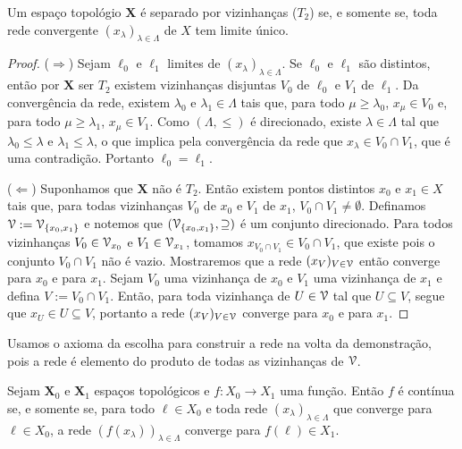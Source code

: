 \begin{prop}
Um espaço topológio $\bm X$ é separado por vizinhanças ($T_2$)  se, e somente se, toda rede convergente $(x_\lambda)_{\lambda \in \Lambda}$ de $X$ tem limite único.
\end{prop}
\begin{proof}
($\Rightarrow$) Sejam $\ell_0$ e $\ell_1$ limites de $(x_\lambda)_{\lambda \in \Lambda}$. Se $\ell_0$ e $\ell_1$ são distintos, então por $\bm X$ ser $T_2$ existem vizinhanças disjuntas $V_0$ de $\ell_0$ e $V_1$ de $\ell_1$. Da convergência da rede, existem $\lambda_0$ e $\lambda_1 \in \Lambda$ tais que, para todo $\mu\geq \lambda_0$, $x_\mu \in V_0$ e, para todo $\mu \geq \lambda_1$, $x_\mu \in V_1$. Como $(\Lambda,\leq)$ é direcionado, existe $\lambda \in \Lambda$ tal que $\lambda_0 \leq \lambda$ e $\lambda_1 \leq \lambda$, o que implica pela convergência da rede que $x_\lambda \in V_0 \cap V_1$, que é uma contradição. Portanto $\ell_0=\ell_1$.

($\Leftarrow$) Suponhamos que $\bm X$ não é $T_2$. Então existem pontos distintos $x_0$ e $x_1 \in X$ tais que, para todas vizinhanças $V_0$ de $x_0$ e $V_1$ de $x_1$, $V_0 \cap V_1 \neq \emptyset$. Definamos $\mathcal{V} := \mathcal{V}_{\{x_0,x_1\}}$ e notemos que $(\mathcal{V}_{\{x_0,x_1\}},\supseteq)$ é um conjunto direcionado. Para todos vizinhanças $V_0 \in \mathcal{V}_{x_0}$ e $V_1 \in \mathcal{V}_{x_1}$, tomamos $x_{V_0 \cap V_1} \in V_0 \cap V_1$, que existe pois o conjunto $V_0 \cap V_1$ não é vazio. Mostraremos que a rede $(x_V)_{V \in \mathcal{V}}$ então converge para $x_0$ e para $x_1$. Sejam $V_0$ uma vizinhança de $x_0$ e $V_1$ uma vizinhança de $x_1$ e defina $V := V_0 \cap V_1$. Então, para toda vizinhança de $U \in \mathcal{V}$ tal que $U \subseteq V$, segue que $x_U \in U \subseteq V$, portanto a rede $(x_V)_{V \in \mathcal{V}}$  converge para $x_0$ e para $x_1$.
\end{proof}

Usamos o axioma da escolha para construir a rede na volta da demonstração, pois a rede é elemento do produto de todas as vizinhanças de $\mathcal{V}$.

\begin{prop}
Sejam $\bm X_0$ e $\bm X_1$ espaços topológicos e $f: X_0 \to X_1$ uma função. Então $f$ é contínua se, e somente se, para todo $\ell \in X_0$ e toda rede $(x_\lambda)_{\lambda \in \Lambda}$ que converge para $\ell \in X_0$, a rede $(f(x_\lambda))_{\lambda \in \Lambda}$ converge para $f(\ell) \in X_1$.
\end{prop}


